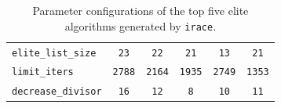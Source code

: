 \begin{table}[!htbp]
{\begin{tabular}{lccccc}
\texttt{elite\_list\_size} & \texttt{23} & \texttt{22} & \texttt{21} & \texttt{13} & \texttt{21} \\ 
\texttt{limit\_iters} & \texttt{2788} & \texttt{2164} & \texttt{1935} & \texttt{2749} & \texttt{1353} \\ 
\texttt{decrease\_divisor} & \texttt{16} & \texttt{12} & \texttt{8} & \texttt{10} & \texttt{11} \\ \hline
\end{tabular}
}
\caption{Parameter configurations of the top five elite algorithms generated by \texttt{irace}.}
\label{tab:irace_elites_vertical}
\end{table}


